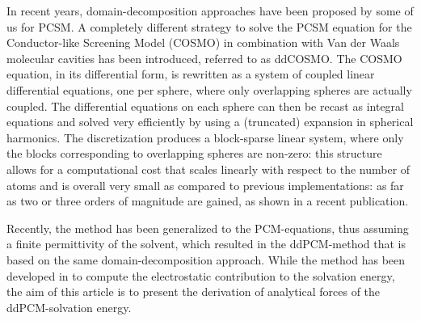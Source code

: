 In recent years, domain-decomposition approaches have been proposed by some of us for PCSM. A completely different strategy\cite{Cances_JCP_ddCOSMO} to solve the PCSM equation for the Conductor-like Screening Model\cite{Klamt_JCS_Cosmo} (COSMO) in combination with Van der Waals molecular cavities has been introduced, referred to as ddCOSMO\cite{Cances_JCP_ddCOSMO,Lipparini_JCTC_ddCOSMO,Lipparini_JPCL_ddCOSMO,Lipparini_JCP_ddCOSMO-QM}.
The COSMO equation, in its differential form, is rewritten as a system of coupled linear differential equations, one per sphere, where only overlapping spheres are actually coupled. The differential equations on each sphere can then be recast as integral equations and solved very efficiently by using a (truncated) expansion in spherical harmonics\cite{Cances_JCP_ddCOSMO}. The discretization produces a block-sparse linear system\cite{Lipparini_JCTC_ddCOSMO}, where only the blocks corresponding to overlapping spheres are non-zero: this structure allows for a computational cost that scales linearly with respect to the number of atoms and is overall very small as compared to previous implementations: as far as two or three orders of magnitude are gained, as shown in a recent publication\cite{Lipparini_JPCL_ddCOSMO}.

Recently, the method has been generalized to the PCM-equations, thus assuming a finite permittivity of the solvent, which resulted in the ddPCM-method\cite{Stamm_JCP_DDPCM} that is based on the same domain-decomposition approach. 
While the method has been developed in \cite{Stamm_JCP_DDPCM} to compute the electrostatic contribution to the solvation energy, the aim of this article is to present the derivation of analytical forces of the ddPCM-solvation energy.

